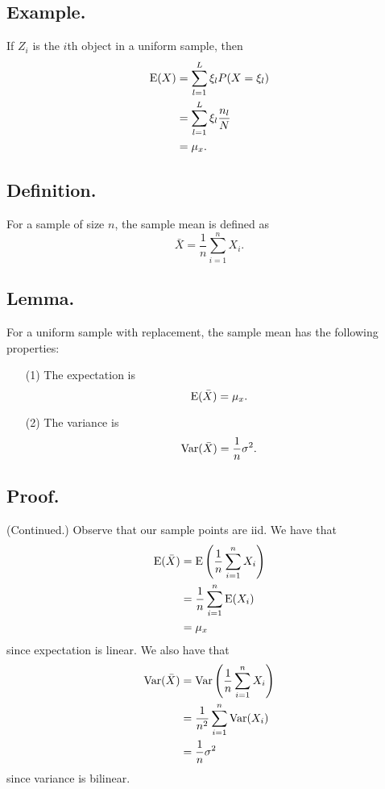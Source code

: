 \documentclass[titlepage]{article}
\begin{document}
\subsection{Example.} If $Z_{i}$ is the $i$th object in a uniform sample, then 
\begin{align*}
    \text{E}(X) &= \sum_{l=1}^{L}\xi_{l}P(X = \xi_{l}) \\
           &= \sum_{l=1}^{L}\xi_{l}\frac{n_{l}}{N} \\
           &= \mu_{x}.
\end{align*}

\subsection{Definition.} For a sample of size $n$, the sample mean is defined as 
$$\bar{X} = \frac{1}{n}\sum_{i=1}^{n}X_{i}.$$

\subsection{Lemma.} For a uniform sample with replacement, the sample mean has the following properties:
\begin{enumerate}
\item[(1)] The expectation is 
$$\text{E}(\bar{X}) = \mu_{x}.$$
\item[(2)] The variance is
$$\text{Var}(\bar{X}) = \frac{1}{n}\sigma^{2}.$$
\end{enumerate}

\subsection{Proof.} (Continued.) Observe that our sample points are iid. We have that 
\begin{align*}
    \text{E}(\bar{X}) &= \text{E}\left(\frac{1}{n}\sum_{i=1}^{n}X_{i}\right) \\
                &= \frac{1}{n}\sum_{i=1}^{n}\text{E}(X_{i}) \\
                &= \mu_{x}
\end{align*}
since expectation is linear. We also have that 
\begin{align*}
    \text{Var}(\bar{X}) &= \text{Var}\left(\frac{1}{n}\sum_{i=1}^{n}X_{i}\right) \\
                  &= \frac{1}{n^{2}}\sum_{i=1}^{n}\text{Var}(X_{i}) \\
                  &= \frac{1}{n}\sigma^{2}
\end{align*}
since variance is bilinear.
\end{document}
